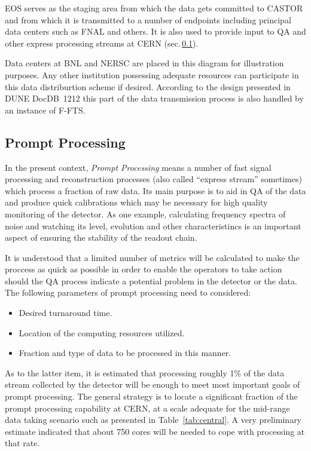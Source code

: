 \documentclass[pdftex,12pt,letter]{article}
\begin{document}
EOS serves as the staging area from which the data gets committed to CASTOR
and from which it is transmitted to a number of endpoints including principal data centers such as FNAL and others.
It is also used to provide input to QA and other express processing streams at CERN (sec.\,\ref{sec:prompt_processing}).

Data centers at BNL and NERSC are placed in this diagram for illustration purposes. Any other institution possessing adequate
resources can participate in this data distriburtion scheme if desired. According to the design presented in DUNE DocDB~1212
this part of the data transmission process is also handled by an instance of F-FTS.


\subsection{Prompt Processing}
\label{sec:prompt_processing}
In the present context, \textit{Prompt Processing} means a number of fast signal processing and reconstruction processes
(also called ``express stream'' sometimes) which process a fraction of raw data. Its main purpose is to aid in QA of the data
and produce quick calibrations which may be necessary for high quality monitoring of the detector. As one example,
calculating frequency spectra of noise and watching its level, evolution and other characteristincs is an important aspect of ensuring
the stability of the readout chain.

It is understood
that a limited number of metrics will be calculated to make the proccess as quick as possible in order to enable
the operators to take action should the QA process indicate a potential problem in the detector or the data.
The following parameters of prompt processing need to considered:
\begin{itemize}
\item Desired turnaround time.
\item Location of the computing resources utilized.
\item Fraction and type of data to be processed in this manner.
\end{itemize}

\noindent As to the latter item, it is estimated that processing roughly 1\% of the data stream collected by the detector will
be enough to meet most important goals of prompt processing. 
The general strategy is to locate a significant fraction of the prompt processing capability at CERN, at a scale adequate for the mid-range
data taking scenario such as presented in Table\, \ref{tab:central}. A very preliminary estimate indicated that about 750 cores
will be needed to cope with processing at that rate.
\end{document}
